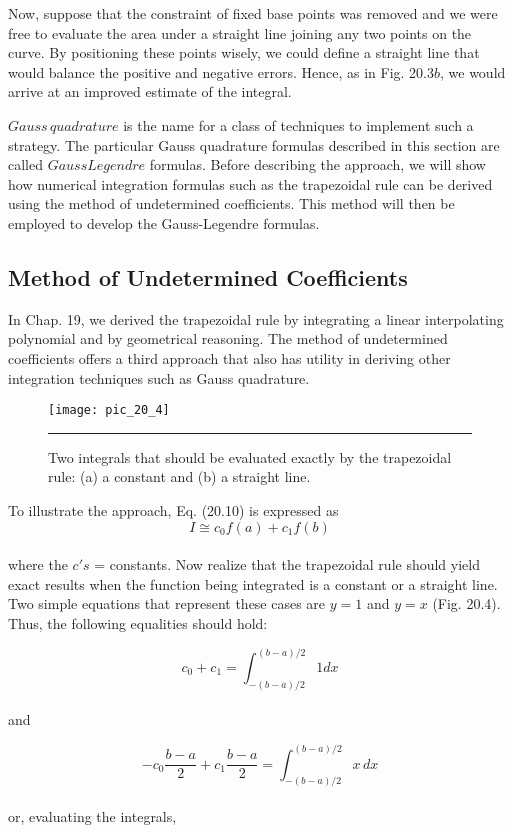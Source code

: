 \documentclass[../main.tex]{subfiles}
\begin{document}
Now, suppose that the constraint of fixed base points was removed and we were free to
evaluate the area under a straight line joining any two points on the curve. By positioning
these points wisely, we could define a straight line that would balance the positive and negative errors. Hence, as in Fig. 20.3$b$, we would arrive at an improved estimate of the integral.

$Gauss\, quadrature$ is the name for a class of techniques to implement such a strategy.
The particular Gauss quadrature formulas described in this section are called $GaussLegendre$ formulas. Before describing the approach, we will show how numerical integration formulas such as the trapezoidal rule can be derived using the method of undetermined
coefficients. This method will then be employed to develop the Gauss-Legendre formulas.


\subsection{Method of Undetermined Coefficients}
In Chap. 19, we derived the trapezoidal rule by integrating a linear interpolating polynomial
and by geometrical reasoning. The method of undetermined coefficients offers a third approach that also has utility in deriving other integration techniques such as Gauss quadrature.\\
\begin{figure}[hbt!]
	\centering
	\texttt{[image: pic\_20\_4]}
	\caption{\textsf{Two integrals that should be evaluated exactly by the trapezoidal rule: (a) a constant and 
(b) a straight line.}} \hrule
	\label{pic.20.4}
\end{figure}

To illustrate the approach, Eq. (20.10) is expressed as
\begin{equation}
	\tag{20.11}
	I\cong c_0 f(a) + c_1 f(b)
\end{equation}\\
where the $c's$ = constants. Now realize that the trapezoidal rule should yield exact results
when the function being integrated is a constant or a straight line. Two simple equations
that represent these cases are $y = 1$ and $y = x$ (Fig. 20.4). Thus, the following equalities
should hold:

	$$c_0 + c_1 = \int^{(b-a)/2}_{-(b-a)/2} 1dx$$\\
and

	$$-c_0 \dfrac{b-a}{2}+c_1 \dfrac{b-a}{2} = \int^{(b-a)/2}_{-(b-a)/2} x\, dx$$\\
or, evaluating the integrals,
\end{document}
